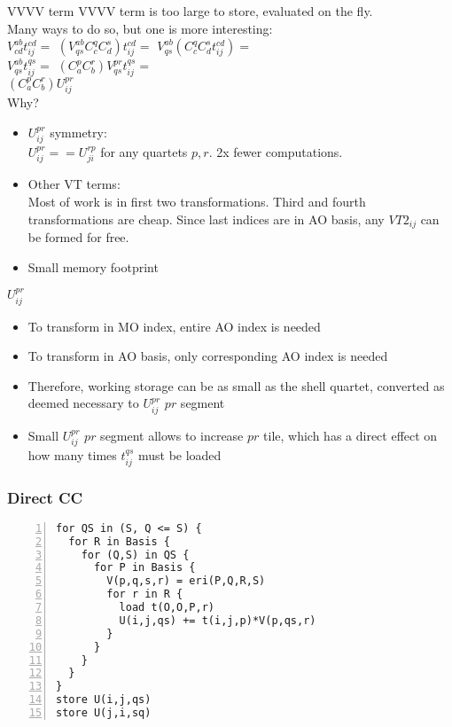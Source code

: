 \documentclass{beamer}
\begin{document}
\begin{frame}{VVVV term}
  VVVV term is too large to store, evaluated on the fly. \\
  Many ways to do so, but one is more interesting:\\

  $V^{ab}_{cd} t^{cd}_{ij} = $ 
  $(V^{ab}_{qs} C^q_c C^s_d) t^{cd}_{ij} = $
  $V^{ab}_{qs} (C^q_c C^s_d t^{cd}_{ij}) = $ \\
  $V^{ab}_{qs} t^{qs}_{ij} = $ 
  $(C^p_a C^r_b) V^{pr}_{qs} t^{qs}_{ij} =$  \\
  $(C^p_a C^r_b) U^{pr}_{ij}$ \\

  Why?

  \begin{itemize}
  \item $U^{pr}_{ij}$ symmetry: \\
    $U^{pr}_{ij} == U^{rp}_{ji}$ for any quartets $p,r$.
    2x fewer computations.
  \item Other VT terms:\\
     Most of work is in first two transformations.
    Third and fourth transformations are cheap.  Since last indices are in
    AO basis, any $VT2_{ij}$ can be formed for free.
  \item Small memory footprint
  \end{itemize}

\end{frame}


\begin{frame}{$U^{pr}_{ij}$}
\begin{itemize}
  \item To transform in MO index, entire  AO index is needed
  \item To transform in AO basis, only corresponding AO index is
    needed
\item Therefore, working storage can be as small as the
  shell quartet, converted as deemed necessary to $U^{pr}_{ij}$ $pr$ segment
\item Small $U^{pr}_{ij}$ $pr$ segment allows to increase $pr$ tile,
   which has a direct effect on how many times $t^{qs}_{ij}$ must be loaded
\end{itemize}
\end{frame}

\begin{frame}[fragile]
\frametitle{Direct CC}

\begin{lstlisting}[caption=Direct CC, numbers=left]
for QS in (S, Q <= S) {
  for R in Basis {
    for (Q,S) in QS {
      for P in Basis {
        V(p,q,s,r) = eri(P,Q,R,S)
        for r in R {
          load t(O,O,P,r)
          U(i,j,qs) += t(i,j,p)*V(p,qs,r) 
        }
      }
    }
  }
}
store U(i,j,qs)
store U(j,i,sq)
\end{lstlisting}

\end{frame}
\end{document}
